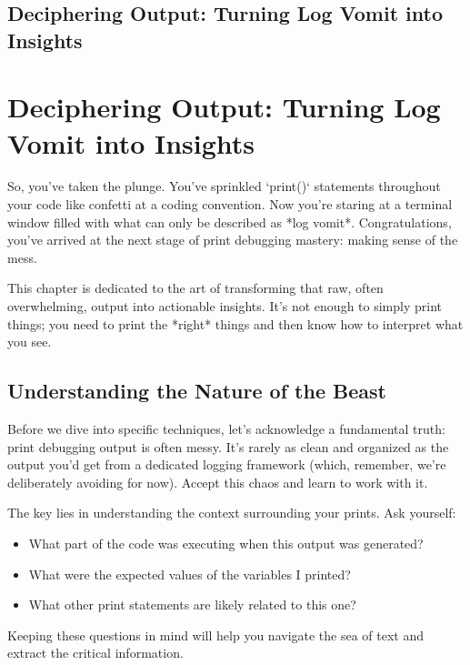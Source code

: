 \documentclass{article}
\begin{document}
\section*{Deciphering Output: Turning Log Vomit into Insights} %
\label{chapter-1-3-Deciphering_Output__Turning_Log_Vomit_in}

\chapter{Deciphering Output: Turning Log Vomit into Insights}

So, you've taken the plunge. You've sprinkled `print()` statements throughout your code like confetti at a coding convention. Now you're staring at a terminal window filled with what can only be described as *log vomit*. Congratulations, you've arrived at the next stage of print debugging mastery: making sense of the mess.

This chapter is dedicated to the art of transforming that raw, often overwhelming, output into actionable insights. It's not enough to simply print things; you need to print the *right* things and then know how to interpret what you see.

\section*{Understanding the Nature of the Beast}

Before we dive into specific techniques, let's acknowledge a fundamental truth: print debugging output is often messy. It's rarely as clean and organized as the output you'd get from a dedicated logging framework (which, remember, we're deliberately avoiding for now). Accept this chaos and learn to work with it.

The key lies in understanding the context surrounding your prints. Ask yourself:

\begin{itemize}
    \item What part of the code was executing when this output was generated?
    \item What were the expected values of the variables I printed?
    \item What other print statements are likely related to this one?
\end{itemize}

Keeping these questions in mind will help you navigate the sea of text and extract the critical information.
\end{document}
